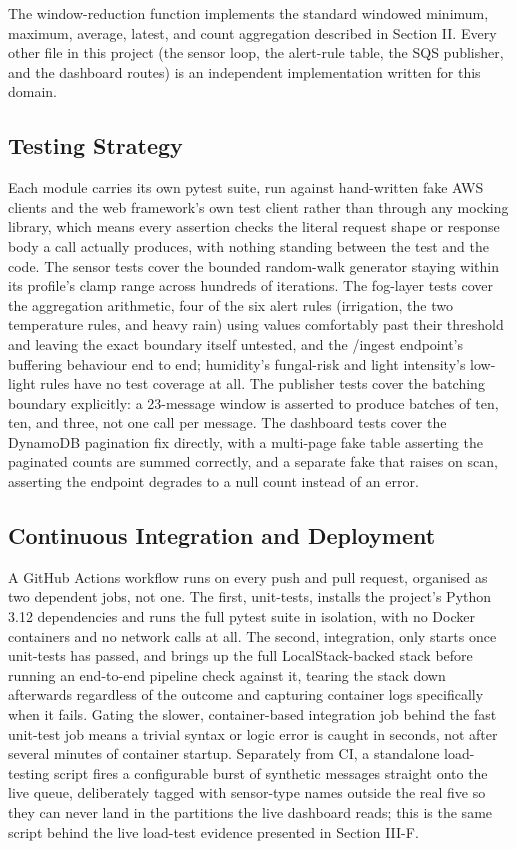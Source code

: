 \documentclass[conference]{IEEEtran}
\begin{document}
The window-reduction function implements the standard windowed minimum, maximum, average, latest, and count aggregation described in Section II. Every other file in this project (the sensor loop, the alert-rule table, the SQS publisher, and the dashboard routes) is an independent implementation written for this domain.

\subsection{Testing Strategy}
Each module carries its own pytest suite, run against hand-written fake AWS clients and the web framework's own test client rather than through any mocking library, which means every assertion checks the literal request shape or response body a call actually produces, with nothing standing between the test and the code. The sensor tests cover the bounded random-walk generator staying within its profile's clamp range across hundreds of iterations. The fog-layer tests cover the aggregation arithmetic, four of the six alert rules (irrigation, the two temperature rules, and heavy rain) using values comfortably past their threshold and leaving the exact boundary itself untested, and the /ingest endpoint's buffering behaviour end to end; humidity's fungal-risk and light intensity's low-light rules have no test coverage at all. The publisher tests cover the batching boundary explicitly: a 23-message window is asserted to produce batches of ten, ten, and three, not one call per message. The dashboard tests cover the DynamoDB pagination fix directly, with a multi-page fake table asserting the paginated counts are summed correctly, and a separate fake that raises on scan, asserting the endpoint degrades to a null count instead of an error.

\subsection{Continuous Integration and Deployment}
A GitHub Actions workflow runs on every push and pull request, organised as two dependent jobs, not one. The first, unit-tests, installs the project's Python 3.12 dependencies and runs the full pytest suite in isolation, with no Docker containers and no network calls at all. The second, integration, only starts once unit-tests has passed, and brings up the full LocalStack-backed stack before running an end-to-end pipeline check against it, tearing the stack down afterwards regardless of the outcome and capturing container logs specifically when it fails. Gating the slower, container-based integration job behind the fast unit-test job means a trivial syntax or logic error is caught in seconds, not after several minutes of container startup. Separately from CI, a standalone load-testing script fires a configurable burst of synthetic messages straight onto the live queue, deliberately tagged with sensor-type names outside the real five so they can never land in the partitions the live dashboard reads; this is the same script behind the live load-test evidence presented in Section III-F.
\end{document}
